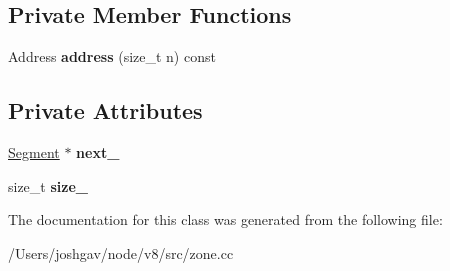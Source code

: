 \subsection*{Private Member Functions}
\begin{DoxyCompactItemize}
\item 
Address {\bfseries address} (size\+\_\+t n) const \hypertarget{classv8_1_1internal_1_1_segment_aa9737e52dabfbf003ed58407ac1b2870}{}\label{classv8_1_1internal_1_1_segment_aa9737e52dabfbf003ed58407ac1b2870}

\end{DoxyCompactItemize}
\subsection*{Private Attributes}
\begin{DoxyCompactItemize}
\item 
\hyperlink{classv8_1_1internal_1_1_segment}{Segment} $\ast$ {\bfseries next\+\_\+}\hypertarget{classv8_1_1internal_1_1_segment_af0ed8d1255018af4f1cab1c38fd375aa}{}\label{classv8_1_1internal_1_1_segment_af0ed8d1255018af4f1cab1c38fd375aa}

\item 
size\+\_\+t {\bfseries size\+\_\+}\hypertarget{classv8_1_1internal_1_1_segment_a5398c6ced7ca3804b33dcb5da69e46f7}{}\label{classv8_1_1internal_1_1_segment_a5398c6ced7ca3804b33dcb5da69e46f7}

\end{DoxyCompactItemize}


The documentation for this class was generated from the following file\+:\begin{DoxyCompactItemize}
\item 
/\+Users/joshgav/node/v8/src/zone.\+cc\end{DoxyCompactItemize}
